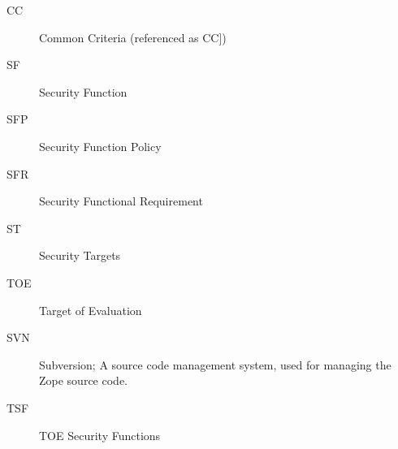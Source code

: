 \documentclass[12pt,english]{scrbook}
\begin{document}
\begin{description}

  \item[CC] Common Criteria (referenced as CC])
  \item[SF] Security Function
  \item[SFP] Security Function Policy
  \item[SFR] Security Functional Requirement
  \item[ST] Security Targets
  \item[TOE] Target of Evaluation
  \item[SVN] Subversion; A source code management system, used for managing the Zope source code.
  \item[TSF] TOE Security Functions

\end{description} 

\end{document}
